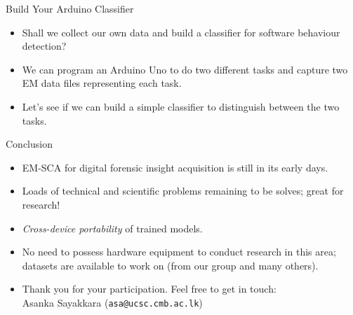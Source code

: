 \documentclass[handout]{beamer}
\begin{document}
\begin{frame}{Build Your Arduino Classifier}

\begin{itemize}
\footnotesize
\item Shall we collect our own data and build a classifier for software behaviour detection?
\vspace{10pt}
\item We can program an Arduino Uno to do two different tasks and capture two EM data files representing each task.
\vspace{10pt}
\item Let's see if we can build a simple classifier to distinguish between the two tasks.
\end{itemize}

\end{frame}


\begin{frame}{Conclusion}

\begin{itemize}
\footnotesize
\item EM-SCA for digital forensic insight acquisition is still in its early days.
\vspace{10pt}
\item Loads of technical and scientific problems remaining to be solves; great for research!
\vspace{10pt}
\item \emph{Cross-device portability} of trained models.
\vspace{10pt}
\item No need to possess hardware equipment to conduct research in this area; datasets are available to work on (from our group and many others).
\vspace{10pt}
\item Thank you for your participation. Feel free to get in touch: \\ 
	\vspace{5pt} 
	Asanka Sayakkara (\texttt{asa@ucsc.cmb.ac.lk})
\end{itemize}

\end{frame}
\end{document}
